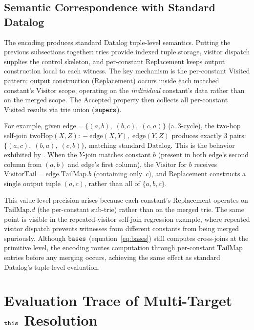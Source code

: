 \subsection{Semantic Correspondence with Standard Datalog}
\label{sec:datalog-semantics}

The encoding produces standard Datalog tuple-level semantics.
Putting the previous subsections together: tries provide indexed
tuple storage, visitor dispatch supplies the control skeleton,
and per-constant $\mathrm{Replacement}$ keeps output
construction local to each witness.
The key mechanism is the per-constant $\mathrm{Visited}$
pattern: output construction ($\mathrm{Replacement}$)
occurs inside each matched constant's $\mathrm{Visitor}$
scope, operating on the \emph{individual} constant's data
rather than on the merged scope.
The $\mathrm{Accepted}$ property then collects all per-constant
$\mathrm{Visited}$ results via trie union ($\mathtt{supers}$).

For example, given $\mathrm{edge} = \{(a,b),\; (b,c),\; (c,a)\}$
(a~3-cycle), the two-hop self-join
$\mathrm{twoHop}(X, Z) \mathrel{{:}\!{-}} \mathrm{edge}(X, Y),\; \mathrm{edge}(Y, Z)$
produces exactly $3$ pairs:
$\{(a,c),\; (b,a),\; (c,b)\}$, matching standard Datalog.
This is the behavior exhibited by
.
When the $Y$-join matches constant $b$ (present in both
  $\mathrm{edge}$'s second column from $(a,b)$ and
$\mathrm{edge}$'s first column), the $\mathrm{Visitor}$ for
$b$ receives $\mathrm{VisitorTail} = \mathrm{edge}.\mathrm{TailMap}.b$
(containing only~$c$), and $\mathrm{Replacement}$ constructs
a single output tuple $(a, c)$, rather than all of $\{a,b,c\}$.

This value-level precision arises because each constant's
$\mathrm{Replacement}$ operates on $\mathrm{TailMap}.d$
(the per-constant sub-trie) rather than on the merged
trie.
The same point is visible in
the repeated-visitor self-join regression example,
where repeated visitor dispatch prevents witnesses from
different constants from being merged spuriously.
Although $\mathtt{bases}$ (equation~\ref{eq:bases}) still computes
cross-joins at the primitive level, the encoding routes
computation through per-constant $\mathrm{TailMap}$ entries
before any merging occurs, achieving the same effect as
standard Datalog's tuple-level evaluation.

\section{Evaluation Trace of Multi-Target \texorpdfstring{$\mathtt{this}$}{this} Resolution}
\label{app:evaluation-trace}

